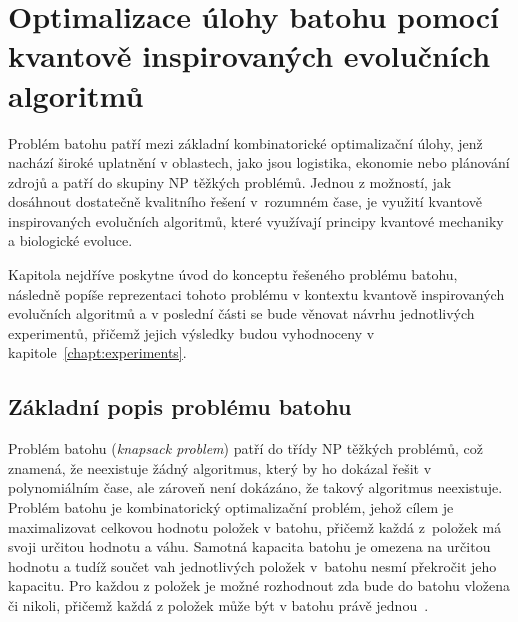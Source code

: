 \chapter{Optimalizace úlohy batohu pomocí kvantově inspirovaných evolučních algoritmů}

Problém batohu patří mezi základní kombinatorické optimalizační úlohy, jenž nachází široké uplatnění v oblastech, jako jsou logistika, ekonomie nebo plánování zdrojů a patří do skupiny NP těžkých problémů. 
Jednou z možností, jak dosáhnout dostatečně kvalitního řešení v~rozumném čase, je využití kvantově inspirovaných evolučních algoritmů, které využívají principy kvantové mechaniky a biologické evoluce. 

Kapitola nejdříve poskytne úvod do konceptu řešeného problému batohu, následně popíše reprezentaci tohoto problému v kontextu kvantově inspirovaných evolučních algoritmů a v poslední části se bude věnovat návrhu jednotlivých experimentů, přičemž jejich výsledky budou vyhodnoceny v kapitole~\ref{chapt:experiments}.

\section{Základní popis problému batohu}
Problém batohu (\emph{knapsack problem}) patří do třídy NP těžkých problémů, což znamená, že neexistuje žádný algoritmus, který by ho dokázal řešit v polynomiálním čase, ale zároveň není dokázáno, že takový algoritmus neexistuje.
Problém batohu je kombinatorický optimalizační problém, jehož cílem je maximalizovat celkovou hodnotu položek v batohu, přičemž každá z~položek má svoji určitou hodnotu a váhu. 
Samotná kapacita batohu je omezena na určitou hodnotu a tudíž součet vah jednotlivých položek v~batohu nesmí překročit jeho kapacitu. 
Pro každou z položek je možné rozhodnout zda bude do batohu vložena či nikoli, přičemž každá z položek může být v batohu právě jednou~\cite{ApproximationAlgorithms,IntroductionToAlgorithms}. 

